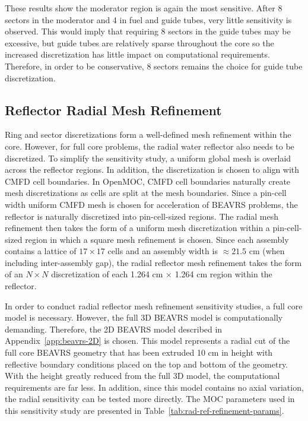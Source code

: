 These results show the moderator region is again the most sensitive. After 8 sectors in the moderator and 4 in fuel and guide tubes, very little sensitivity is observed. This would imply that requiring 8 sectors in the guide tubes may be excessive, but guide tubes are relatively sparse throughout the core so the increased discretization has little impact on computational requirements. Therefore, in order to be conservative, 8 sectors remains the choice for guide tube discretization.

\newpage
\subsection{Reflector Radial Mesh Refinement}

Ring and sector discretizations form a well-defined mesh refinement within the core. However, for full core problems, the radial water reflector also needs to be discretized. To simplify the sensitivity study, a uniform global mesh is overlaid across the reflector regions. In addition, the discretization is chosen to align with \ac{CMFD} cell boundaries. In OpenMOC, \ac{CMFD} cell boundaries naturally create mesh discretizations as cells are split at the mesh boundaries. Since a pin-cell width uniform \ac{CMFD} mesh is chosen for acceleration of BEAVRS problems, the reflector is naturally discretized into pin-cell-sized regions. The radial mesh refinement then takes the form of a uniform mesh discretization within a pin-cell-sized region in which a square mesh refinement is chosen. Since each assembly contains a lattice of $17\times 17$ cells and an assembly width is $\approx 21.5$ cm (when including inter-assembly gap), the radial reflector mesh refinement takes the form of an $N \times N$ discretization of each 1.264 cm $\times$ 1.264 cm region within the reflector.

In order to conduct radial reflector mesh refinement sensitivity studies, a full core model is necessary. However, the full 3D BEAVRS model is computationally demanding. Therefore, the 2D BEAVRS model described in Appendix~\ref{app:beavrs-2D} is chosen. This model represents a radial cut of the full core BEAVRS geometry that has been extruded 10 cm in height with reflective boundary conditions placed on the top and bottom of the geometry. With the height greatly reduced from the full 3D model, the computational requirements are far less. In addition, since this model contains no axial variation, the radial sensitivity can be tested more directly. The \ac{MOC} parameters used in this sensitivity study are presented in Table~\ref{tab:rad-ref-refinement-params}.


